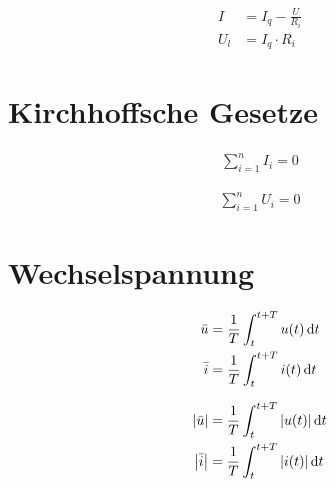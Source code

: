 \begin{boxleft}
\end{boxleft}\begin{boxrightshaded}
\begin{align*}
I&=I_q-\frac{U}{R_i}\\
U_l&=I_q\cdot R_i
\end{align*}
\end{boxrightshaded}

\section{Kirchhoffsche Gesetze}


\begin{boxleft}
\end{boxleft}\begin{boxrightshaded}
\begin{align*}
\sum_{i=1}^n I_i=0
\end{align*}
\end{boxrightshaded}

\begin{boxleft}
\end{boxleft}\begin{boxrightshaded}
\begin{align*}
\sum_{i=1}^n U_i=0
\end{align*}
\end{boxrightshaded}

\section{Wechselspannung}

\begin{boxleft}
\end{boxleft}\begin{boxrightshaded}
\begin{align*}
\bar{u}&=\frac{1}{T}\int_t^{t+T}u(t)\mathop{}\!\mathrm{d} t\\
\bar{i}&=\frac{1}{T}\int_t^{t+T}i(t)\mathop{}\!\mathrm{d} t
\end{align*}
\end{boxrightshaded}

\begin{boxleft}
\end{boxleft}\begin{boxrightshaded}
\begin{align*}
\left|\bar{u}\right|&=\frac{1}{T}\int_t^{t+T}\left|u(t)\right|\mathop{}\!\mathrm{d} t\\
\left|\bar{i}\right|&=\frac{1}{T}\int_t^{t+T}\left|i(t)\right|\mathop{}\!\mathrm{d} t
\end{align*}
\end{boxrightshaded}

